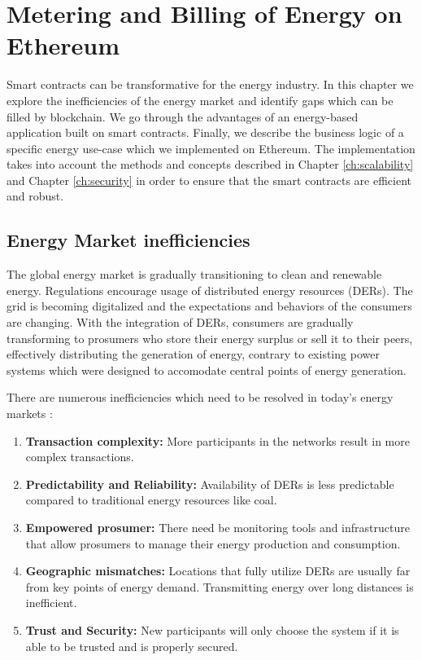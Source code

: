\chapter{Metering and Billing of Energy on Ethereum}\label{ch:implementation}

Smart contracts can be transformative for the energy industry. In this chapter we explore the inefficiencies of the energy market and identify gaps which can be filled by blockchain. We go through the advantages of an energy-based application  built on smart contracts. Finally, we describe the business logic of a specific energy use-case which we implemented on Ethereum. The implementation takes into account the methods and concepts described in Chapter \ref{ch:scalability} and Chapter \ref{ch:security} in order to ensure that the smart contracts are efficient and robust.

\section{Energy Market inefficiencies}

The global energy market is gradually transitioning to clean and renewable energy. Regulations encourage usage of distributed energy resources (DERs). The grid is becoming digitalized and the expectations and behaviors of the consumers are changing. With the integration of DERs, consumers are gradually transforming to prosumers who store their energy surplus or sell it to their peers, effectively distributing the generation of energy, contrary to existing power systems which were designed to accomodate central points of energy generation.

There are numerous inefficiencies which need to be resolved in today's energy markets \cite{ey-inefficiencies}:
\begin{enumerate}
    \item \textbf{Transaction complexity:} More participants in the networks result in more complex transactions.
    \item \textbf{Predictability and Reliability:} Availability of DERs is less predictable compared to traditional energy resources like coal. 
    \item \textbf{Empowered prosumer:} There need be monitoring tools and infrastructure that allow prosumers to manage their energy production and consumption.
    \item \textbf{Geographic mismatches:} Locations that fully utilize DERs are usually far from key points of energy demand. Transmitting energy over long distances is inefficient.
    \item \textbf{Trust and Security:} New participants will only choose the system if it is able to be trusted and is properly secured.
\end{enumerate}


